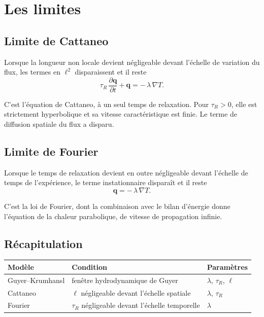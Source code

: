 \documentclass[11pt,a4paper]{article}
\begin{document}
\section{Les limites}

\subsection{Limite de Cattaneo}

Lorsque la longueur non locale devient négligeable devant l'échelle de variation du flux, les termes
en $\ell^2$ disparaissent et il reste
\[ \tau_R\,\frac{\partial \mathbf{q}}{\partial t} + \mathbf{q} = -\,\lambda\,\nabla T . \]

C'est l'équation de Cattaneo, à un seul temps de relaxation. Pour $\tau_R>0$,
elle est strictement hyperbolique et sa vitesse caractéristique est finie.
Le terme de diffusion spatiale du flux a disparu.

\subsection{Limite de Fourier}

Lorsque le temps de relaxation devient en outre négligeable devant l'échelle de temps de
l'expérience, le terme instationnaire disparaît et il reste
\[ \mathbf{q} = -\,\lambda\,\nabla T . \]

C'est la loi de Fourier, dont la combinaison avec le bilan d'énergie donne l'équation de la chaleur
parabolique, de vitesse de propagation infinie.

\subsection{Récapitulation}

\begin{center}
\begin{tabularx}{\textwidth}{@{}lXl@{}}
\toprule
\textbf{Modèle} & \textbf{Condition} & \textbf{Paramètres} \\
\midrule
Guyer--Krumhansl & fenêtre hydrodynamique de Guyer & $\lambda$, $\tau_R$, $\ell$ \\
\addlinespace
Cattaneo & $\ell$ négligeable devant l'échelle spatiale & $\lambda$, $\tau_R$ \\
\addlinespace
Fourier & $\tau_R$ négligeable devant l'échelle temporelle & $\lambda$ \\
\bottomrule
\end{tabularx}
\end{center}
\end{document}
